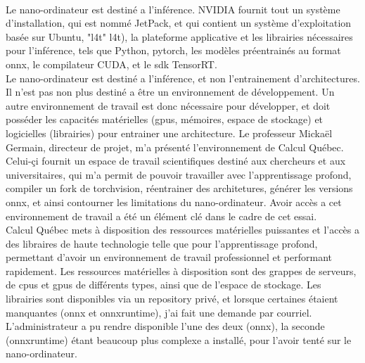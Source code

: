 ﻿
\vspace{0.5\baselineskip}
\\
\noindent Le nano-ordinateur est destiné a l'inférence. NVIDIA fournit tout un système d'installation, qui est nommé JetPack, et qui contient un système d'exploitation basée sur Ubuntu, "\acrlong{l4t}" \acrshort{l4t}), la plateforme applicative et les librairies nécessaires pour l'inférence, tels que Python, pytorch, les modèles préentrainés au format \acrshort{onnx}, le compilateur CUDA, et le \acrshort{sdk} TensorRT.
\vspace{0.5\baselineskip}
\\
\noindent Le nano-ordinateur est destiné a l'inférence, et non l'entrainement d'architectures. Il n'est pas non plus destiné a être un environnement de développement. Un autre environnement de travail est donc nécessaire pour développer, et doit posséder les capacités matérielles (\acrshort{gpu}s, mémoires, espace de stockage) et logicielles (librairies) pour entrainer une architecture. Le professeur Mickaël Germain, directeur de projet, m'a présenté l'environnement de Calcul Québec. Celui-çi fournit un espace de travail scientifiques destiné aux chercheurs et aux universitaires, qui m'a permit  de pouvoir travailler avec l'apprentissage profond, compiler un fork de torchvision, réentrainer des architetures, générer les versions \acrshort{onnx}, et ainsi contourner les limitations du nano-ordinateur. Avoir accès a cet environnement de travail a été un élément clé dans le cadre de cet essai.
\vspace{0.5\baselineskip}
\\
\noindent Calcul Québec mets à disposition des ressources matérielles puissantes et l'accès a des libraires de haute technologie telle que pour l'apprentissage profond, permettant d'avoir un environnement de travail professionnel et performant rapidement. Les ressources matérielles à disposition sont des grappes de serveurs, de \acrshort{cpu}s et \acrshort{gpu}s de différents types, ainsi que de l'espace de stockage. Les librairies sont disponibles via un repository privé, et lorsque certaines étaient manquantes (\acrshort{onnx} et onnxruntime), j'ai fait une demande par courriel. L'administrateur a pu rendre disponible l'une des deux (\acrshort{onnx}), la seconde (onnxruntime) étant beaucoup plus complexe a installé, pour l'avoir tenté sur le nano-ordinateur. 
\vspace{0.5\baselineskip}
\\
